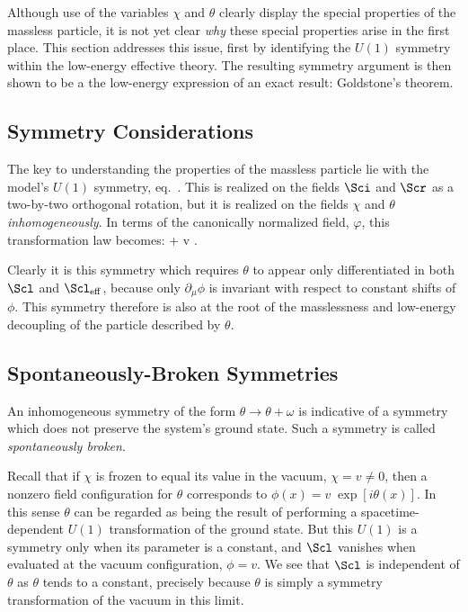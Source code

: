 Although use of the variables $\chi$ and $\theta$ clearly
display the special properties of the massless particle, it is not
yet clear {\em why} these special properties arise in the first
place. This section addresses this issue, first by identifying
the $U(1)$ symmetry within the low-energy effective theory.
The resulting symmetry argument is then shown to be a the
low-energy expression of an exact result: Goldstone's theorem.

\subsection{Symmetry Considerations}

The key to understanding the properties of the massless
particle lie with the model's $U(1)$ symmetry, eq.~.
This is realized on the fields $\Sci$ and $\Scr$ as a two-by-two 
orthogonal rotation, but it is realized on the fields $\chi$ and
$\theta$ {\em inhomogeneously}. In terms of the canonically normalized
field, $\varphi$, this transformation law becomes: 
%
\eq
\label{gbabeltransf}
\varphi \to \varphi +  \; v \; \omega. \eeq

Clearly it is this symmetry which requires $\theta$ to
appear only differentiated in both $\Scl$ and $\Scl_{\rm eff}$,
because only $\partial_\mu \phi$ is invariant with respect to
constant shifts of $\phi$. This symmetry therefore is also at
the root of the masslessness and low-energy decoupling of
the particle described by $\theta$. 

\subsection{Spontaneously-Broken Symmetries}

An inhomogeneous symmetry of the form $\theta \to \theta
+ \omega$ is indicative of a symmetry which does not 
preserve the system's ground state. Such a symmetry
is called {\sl spontaneously broken}. 

Recall that if $\chi$ is frozen to equal its value in the
vacuum, $\chi = v \ne 0$, then a nonzero field configuration 
for $\theta$ corresponds to $\phi(x) = v \; \exp[ i \theta(x)]$. 
In this sense $\theta$ can be regarded as being the result of
performing a spacetime-dependent $U(1)$ transformation 
of the ground state. But this $U(1)$ is a symmetry only when
its parameter is a constant, and $\Scl$ vanishes when
evaluated at the vacuum configuration, $\phi = v$. We see
that $\Scl$ is independent of $\theta$ as $\theta$ tends to
a constant, precisely because $\theta$ is simply a symmetry
transformation of the vacuum in this limit. 

